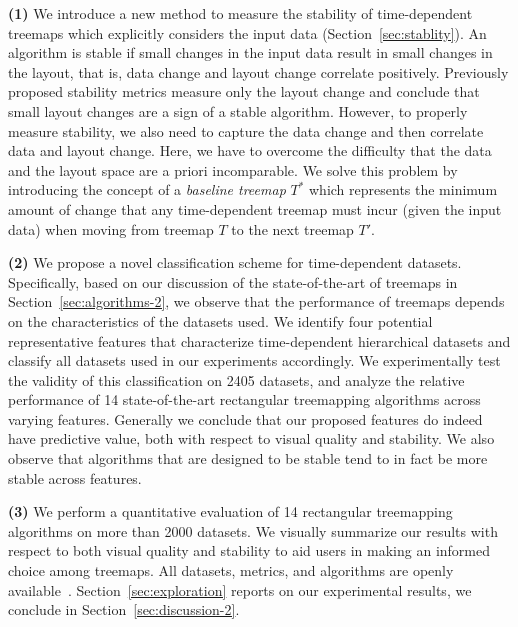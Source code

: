 \noindent
\textbf{(1)} We introduce a new method to measure the stability of time-dependent treemaps which explicitly considers the input data (Section~\ref{sec:stablity}). An algorithm is stable if small changes in the input data result in small changes in the layout, that is, data change and layout change correlate positively. Previously proposed stability metrics measure only the layout change and conclude that small layout changes are a sign of a stable algorithm. However, to properly measure stability, we also need to capture the data change and then correlate data and layout change. Here, we have to
overcome the difficulty that the data and the layout space are a priori incomparable. We solve this problem by introducing the concept of a \emph{baseline treemap} $T^*$ which represents the minimum amount of change that any time-dependent treemap must incur (given the input data) when moving from treemap $T$ to the next treemap $T'$.

\noindent
\textbf{(2)} We propose a novel classification scheme for time-dependent datasets. Specifically, based on our discussion of the state-of-the-art of treemaps in Section~\ref{sec:algorithms-2}, we observe that the performance of treemaps depends on the characteristics of the datasets used. We identify four potential representative features that characterize time-dependent hierarchical datasets and classify all datasets used in our experiments accordingly. We experimentally test the validity of this classification on 2405 datasets, and analyze the relative performance of 14 state-of-the-art rectangular treemapping algorithms across varying features. Generally we conclude that our proposed features do indeed have predictive value, both with respect to visual quality and stability. We also observe that algorithms that are designed to be stable tend to in fact be more stable across features.

\noindent
\textbf{(3)} We perform a quantitative evaluation of 14 rectangular treemapping algorithms on more than 2000 datasets. We visually summarize our results with respect to both visual quality and stability to aid users in making an informed choice among treemaps. All datasets, metrics, and algorithms are openly available~\citep{URLTreemaps}. Section~\ref{sec:exploration} reports on our experimental results, we conclude in Section~\ref{sec:discussion-2}.


